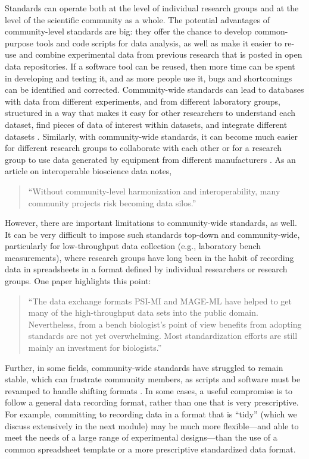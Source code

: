 \documentclass[]{tufte-book}
\begin{document}
Standards can operate both at the level of individual research groups and at the
level of the scientific community as a whole. The potential advantages of
community-level standards are big: they offer the chance to develop
common-purpose tools and code scripts for data analysis, as well as make it
easier to re-use and combine experimental data from previous research that is
posted in open data repositories. If a software tool can be reused, then more
time can be spent in developing and testing it, and as more people use it, bugs
and shortcomings can be identified and corrected. Community-wide standards can
lead to databases with data from different experiments, and from different
laboratory groups, structured in a way that makes it easy for other researchers
to understand each dataset, find pieces of data of interest within datasets, and
integrate different datasets \citep{lynch2008big}. Similarly, with community-wide
standards, it can become much easier for different research groups to
collaborate with each other or for a research group to use data generated by
equipment from different manufacturers \citep{schadt2010computational}. As
an article on interoperable bioscience data notes,

\begin{quote}
``Without community-level harmonization and interoperability, many community
projects risk becoming data silos.'' \citep{sansone2012toward}
\end{quote}

However, there are important limitations to community-wide standards, as well.
It can be very difficult to impose such standards top-down and community-wide,
particularly for low-throughput data collection (e.g., laboratory bench
measurements), where research groups have long been in the habit of recording
data in spreadsheets in a format defined by individual researchers or research
groups. One paper highlights this point:

\begin{quote}
``The data exchange formats PSI-MI and MAGE-ML have helped to get many of the
high-throughput data sets into the public domain. Nevertheless, from a bench
biologist's point of view benefits from adopting standards are not yet
overwhelming. Most standardization efforts are still mainly an investment for
biologists.'' \citep{brazma2006standards}
\end{quote}

Further, in some fields, community-wide standards have struggled to remain
stable, which can frustrate community members, as scripts and software must be
revamped to handle shifting formats \citep{buffalo2015bioinformatics, barga2011bioinformatics}. In some cases, a useful compromise is to follow a
general data recording format, rather than one that is very prescriptive. For
example, committing to recording data in a format that is ``tidy'' (which we
discuss extensively in the next module) may be much more flexible---and able to
meet the needs of a large range of experimental designs---than the use of a
common spreadsheet template or a more prescriptive standardized data format.
\end{document}

